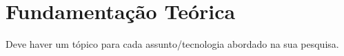 

\chapter{Fundamentação Teórica}
    \label{cha:fundamentacao-teorica}
    
    Deve haver um tópico para cada assunto/tecnologia abordado na sua pesquisa.